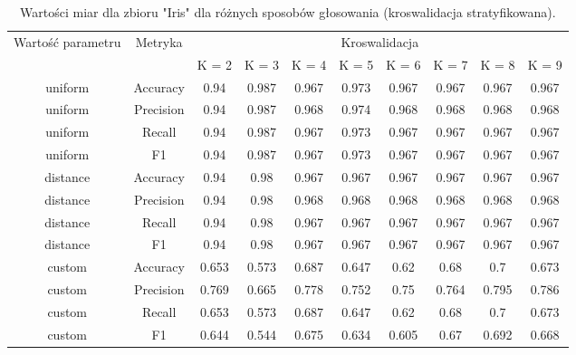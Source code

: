 
\begin{table}[H]
    \begin{tabular}{c|c|cccccccc}
       \multirow{2}{*}{Wartość parametru} & \multirow{2}{*}{Metryka} & \multicolumn{8}{|c|}{Kroswalidacja} \\
         & & K = 2 & K = 3 & K = 4 & K = 5 & K = 6 & K = 7 & K = 8 & K = 9 \\ \hline
         uniform&Accuracy&0.94& 0.987& 0.967& 0.973& 0.967& 0.967& 0.967& 0.967\\ \hline
uniform&Precision&0.94& 0.987& 0.968& 0.974& 0.968& 0.968& 0.968& 0.968\\ \hline
uniform&Recall&0.94& 0.987& 0.967& 0.973& 0.967& 0.967& 0.967& 0.967\\ \hline
uniform&F1&0.94& 0.987& 0.967& 0.973& 0.967& 0.967& 0.967& 0.967\\ \hline
distance&Accuracy&0.94& 0.98& 0.967& 0.967& 0.967& 0.967& 0.967& 0.967\\ \hline
distance&Precision&0.94& 0.98& 0.968& 0.968& 0.968& 0.968& 0.968& 0.968\\ \hline
distance&Recall&0.94& 0.98& 0.967& 0.967& 0.967& 0.967& 0.967& 0.967\\ \hline
distance&F1&0.94& 0.98& 0.967& 0.967& 0.967& 0.967& 0.967& 0.967\\ \hline
custom&Accuracy&0.653& 0.573& 0.687& 0.647& 0.62& 0.68& 0.7& 0.673\\ \hline
custom&Precision&0.769& 0.665& 0.778& 0.752& 0.75& 0.764& 0.795& 0.786\\ \hline
custom&Recall&0.653& 0.573& 0.687& 0.647& 0.62& 0.68& 0.7& 0.673\\ \hline
custom&F1&0.644& 0.544& 0.675& 0.634& 0.605& 0.67& 0.692& 0.668 \\ \hline
    \end{tabular}
    \caption{Wartości miar dla zbioru "Iris" dla różnych sposobów głosowania (kroswalidacja stratyfikowana).}
\end{table}
    